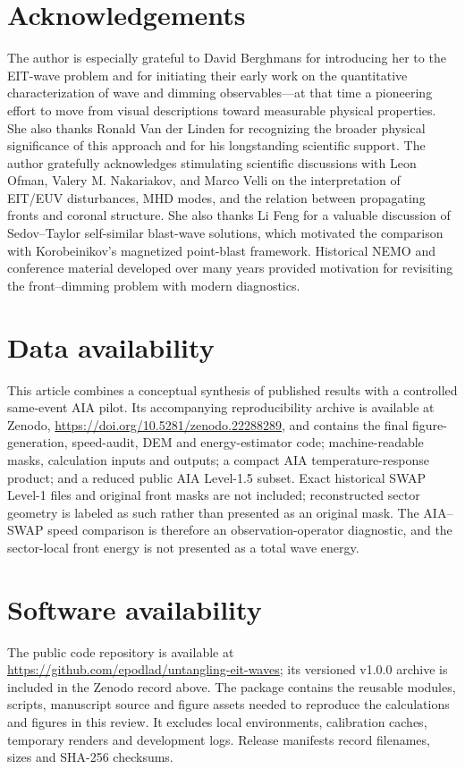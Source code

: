 \documentclass[11pt]{article}
\begin{document}
\section*{Acknowledgements}

The author is especially grateful to David Berghmans for introducing her to the EIT-wave problem and for initiating their early work on the quantitative characterization of wave and dimming observables---at that time a pioneering effort to move from visual descriptions toward measurable physical properties. She also thanks Ronald Van der Linden for recognizing the broader physical significance of this approach and for his longstanding scientific support. The author gratefully acknowledges stimulating scientific discussions with Leon Ofman, Valery M. Nakariakov, and Marco Velli on the interpretation of EIT/EUV disturbances, MHD modes, and the relation between propagating fronts and coronal structure. She also thanks Li Feng for a valuable discussion of Sedov--Taylor self-similar blast-wave solutions, which motivated the comparison with Korobeinikov's magnetized point-blast framework. Historical NEMO and conference material developed over many years provided motivation for revisiting the front--dimming problem with modern diagnostics.

\section*{Data availability}
This article combines a conceptual synthesis of published results with a controlled same-event AIA pilot. Its accompanying reproducibility archive is available at Zenodo, \url{https://doi.org/10.5281/zenodo.22288289}, and contains the final figure-generation, speed-audit, DEM and energy-estimator code; machine-readable masks, calculation inputs and outputs; a compact AIA temperature-response product; and a reduced public AIA Level-1.5 subset. Exact historical SWAP Level-1 files and original front masks are not included; reconstructed sector geometry is labeled as such rather than presented as an original mask. The AIA--SWAP speed comparison is therefore an observation-operator diagnostic, and the sector-local front energy is not presented as a total wave energy.

\section*{Software availability}
The public code repository is available at \url{https://github.com/epodlad/untangling-eit-waves}; its versioned v1.0.0 archive is included in the Zenodo record above. The package contains the reusable modules, scripts, manuscript source and figure assets needed to reproduce the calculations and figures in this review. It excludes local environments, calibration caches, temporary renders and development logs. Release manifests record filenames, sizes and SHA-256 checksums.
\end{document}
